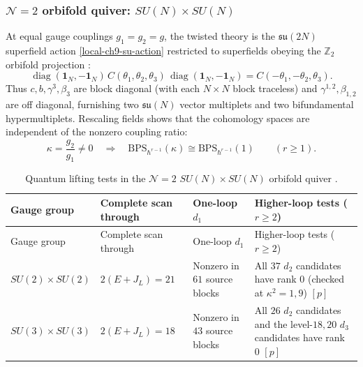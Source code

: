 \documentclass[11pt]{article}
\numberwithin{equation}{section}
\numberwithin{figure}{section}
\numberwithin{table}{section}
\begin{document}
\subsubsection{$\mathcal N=2$ orbifold quiver: $SU(N)\times SU(N)$}\label{sec-results-quiver}

At equal gauge couplings $g_1=g_2=g$, the twisted theory is the $\mathfrak{su}(2N)$ superfield action \eqref{local-ch9-su-action} restricted to superfields obeying the $\mathbb Z_2$ orbifold projection \cite[results report, \S3.1]{Repo}:
\begin{equation}\label{local-ch9-quiver-action}
\operatorname{diag}(\mathbf1_N,-\mathbf1_N)\,
C(\theta_1,\theta_2,\theta_3)\,
\operatorname{diag}(\mathbf1_N,-\mathbf1_N)
=C(-\theta_1,-\theta_2,\theta_3).
\end{equation}
Thus $c,b,\gamma^3,\beta_3$ are block diagonal (with each $N\times N$ block traceless) and $\gamma^{1,2},\beta_{1,2}$ are off diagonal, furnishing two $\mathfrak{su}(N)$ vector multiplets and two bifundamental hypermultiplets. Rescaling fields shows that the cohomology spaces are independent of the nonzero coupling ratio:
\begin{equation}\label{local-ch9-quiver-couplings}
\kappa=\frac{g_2}{g_1}\ne0
\quad\Longrightarrow\quad \mathrm{BPS}_{\hbar^{r-1}}(\kappa)\cong\mathrm{BPS}_{\hbar^{r-1}}(1)
\qquad(r\ge1).
\end{equation}

{\footnotesize\renewcommand{\arraystretch}{1.26}\setlength{\tabcolsep}{3.5pt}
\begin{xltabular}{\linewidth}{|l|>{\raggedright\arraybackslash}p{2.6cm}|>{\raggedright\arraybackslash}X|>{\raggedright\arraybackslash}X|}
\caption{Quantum lifting tests in the $\mathcal N=2$ $SU(N)\times SU(N)$ orbifold quiver \cite[supplement, Section S7.1]{Repo}.}\label{local-ch9-quiver-results}\\
\hline
Gauge group & Complete scan through & One-loop $d_1$ & Higher-loop tests ($r\ge2$)\\
\hline\endfirsthead
\hline
Gauge group & Complete scan through & One-loop $d_1$ & Higher-loop tests ($r\ge2$)\\
\hline\endhead
$SU(2)\times SU(2)$ & $2(E+J_L)=21$ & Nonzero in $61$ source blocks & All $37$ $d_2$ candidates have rank $0$ (checked at $\kappa^2=1,9$) $[p]$\\
\hline
$SU(3)\times SU(3)$ & $2(E+J_L)=18$ & Nonzero in $43$ source blocks & All $26$ $d_2$ candidates and the level-$18,20$ $d_3$ candidates have rank $0$ $[p]$\\
\hline
\end{xltabular}}
\end{document}
